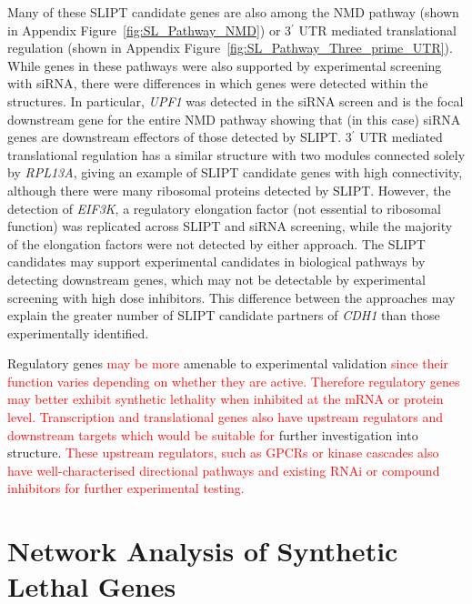 Many of these \gls{SLIPT} candidate genes are also among the \gls{NMD} \gls{pathway} (shown in Appendix Figure~\ref{fig:SL_Pathway_NMD}) or 3$^\prime$ \gls{UTR} mediated translational regulation (shown in Appendix Figure~\ref{fig:SL_Pathway_Three_prime_UTR}). While genes in these \glspl{pathway} were also supported by experimental screening with \gls{siRNA}, there were differences in which genes were detected within the  structures. In particular, \textit{UPF1} was detected in the \gls{siRNA} screen and is the focal downstream gene for the entire \gls{NMD} \gls{pathway} showing that (in this case) \gls{siRNA} genes are downstream effectors of those detected by \gls{SLIPT}.  3$^\prime$ \gls{UTR} mediated translational regulation has a similar structure with two modules connected solely by \textit{RPL13A}, giving an example of \gls{SLIPT} candidate genes with high connectivity, although there were many ribosomal proteins detected by \gls{SLIPT}. However, the detection of \textit{EIF3K}, a regulatory elongation factor (not \gls{essential} to ribosomal function) was replicated across \gls{SLIPT} and \gls{siRNA} screening, while the majority of the elongation factors were not detected by either approach. The \gls{SLIPT} candidates may support experimental candidates in biological \glspl{pathway} by detecting downstream genes, which may not be detectable by experimental screening with high dose inhibitors. This difference between the approaches may explain the greater number of \gls{SLIPT} candidate partners of \textit{CDH1} than those experimentally identified.

Regulatory genes \textcolor{red}{may be more} amenable to experimental validation \textcolor{red}{since their function varies depending on whether they are active. Therefore regulatory genes may better exhibit synthetic lethality when inhibited at the mRNA or protein level. Transcription and translational genes also have upstream regulators and downstream targets which would be suitable for} further investigation into  structure. \textcolor{red}{These upstream regulators, such as GPCRs or kinase cascades also have well-characterised directional pathways and existing RNAi or compound inhibitors for further experimental testing.}

\FloatBarrier

\section{Network Analysis of Synthetic Lethal Genes}   \label{chapt4:Network_Test}

